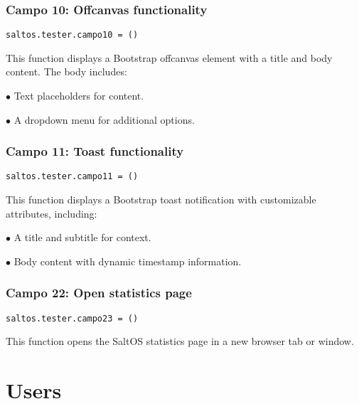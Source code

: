 \documentclass[a4paper]{article}
\begin{document}
\hypertarget{toc172}{}
\subsubsection{Campo 10: Offcanvas functionality}

\begin{lstlisting}
saltos.tester.campo10 = ()
\end{lstlisting}

This function displays a Bootstrap offcanvas element with a title and body content.
The body includes:

\begin{compactitem}
\item[\color{myblue}$\bullet$] Text placeholders for content.
\item[\color{myblue}$\bullet$] A dropdown menu for additional options.
\end{compactitem}

\hypertarget{toc173}{}
\subsubsection{Campo 11: Toast functionality}

\begin{lstlisting}
saltos.tester.campo11 = ()
\end{lstlisting}

This function displays a Bootstrap toast notification with customizable attributes, including:

\begin{compactitem}
\item[\color{myblue}$\bullet$] A title and subtitle for context.
\item[\color{myblue}$\bullet$] Body content with dynamic timestamp information.
\end{compactitem}

\hypertarget{toc174}{}
\subsubsection{Campo 22: Open statistics page}

\begin{lstlisting}
saltos.tester.campo23 = ()
\end{lstlisting}

This function opens the SaltOS statistics page in a new browser tab or window.


\hypertarget{toc175}{}
\section{Users}
\end{document}
